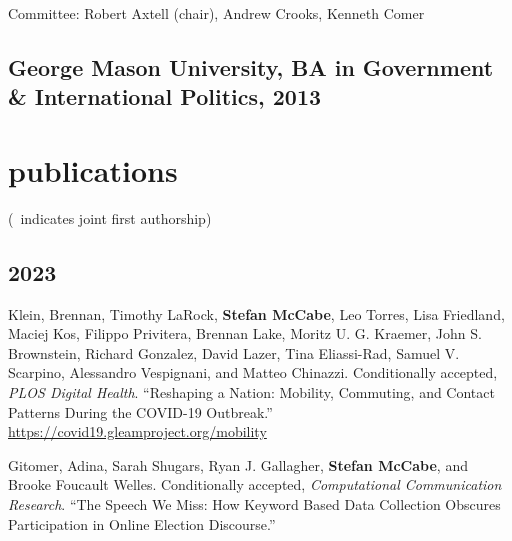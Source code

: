 \documentclass[11pt, letter]{article}
\begin{document}
Committee: Robert Axtell (chair), Andrew Crooks, Kenneth Comer
\subsection{George Mason University, BA in Government \& International Politics,
  2013}

\vspace{2mm}

\section{publications}
\vspace{1mm} {\footnotesize (\textdagger\, indicates joint first authorship)}
\subsection*{} %

\subsection{2023}
\begin{hangparas}{.25in}{1}
Klein, Brennan,\textsuperscript{\textdagger} Timothy LaRock,\textsuperscript{\textdagger} \textbf{Stefan McCabe},\textsuperscript{\textdagger} Leo Torres,\textsuperscript{\textdagger} Lisa Friedland, Maciej Kos, Filippo Privitera, Brennan Lake, Moritz U. G. Kraemer, John S. Brownstein, Richard Gonzalez, David Lazer, Tina Eliassi-Rad, Samuel V. Scarpino, Alessandro Vespignani, and Matteo Chinazzi. Conditionally accepted, \textit{PLOS Digital Health}. ``Reshaping a Nation: Mobility, Commuting, and Contact Patterns During the COVID-19 Outbreak.'' \href{https://covid19.gleamproject.org/mobility}{https://covid19.gleamproject.org/mobility} \vspace{2mm}

Gitomer, Adina, Sarah Shugars, Ryan J. Gallagher, \textbf{Stefan McCabe}, and Brooke Foucault Welles. Conditionally accepted, \textit{Computational Communication Research}. ``The Speech We Miss: How Keyword Based Data Collection Obscures Participation in Online Election Discourse.'' \vspace{2mm}
\end{hangparas}
\end{document}
